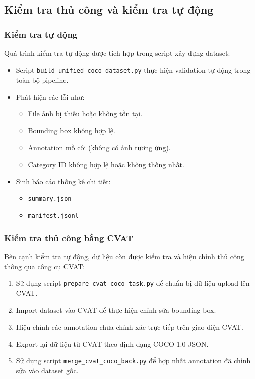 \subsection{Kiểm tra thủ công và kiểm tra tự động}

\subsubsection{Kiểm tra tự động}

Quá trình kiểm tra tự động được tích hợp trong script xây dựng dataset:

\begin{itemize}
    \item Script \texttt{build\_unified\_coco\_dataset.py} thực hiện validation tự động trong toàn bộ pipeline.
    \item Phát hiện các lỗi như:
    \begin{itemize}
        \item File ảnh bị thiếu hoặc không tồn tại.
        \item Bounding box không hợp lệ.
        \item Annotation mồ côi (không có ảnh tương ứng).
        \item Category ID không hợp lệ hoặc không thống nhất.
    \end{itemize}
    \item Sinh báo cáo thống kê chi tiết:
    \begin{itemize}
        \item \texttt{summary.json}
        \item \texttt{manifest.jsonl}
    \end{itemize}
\end{itemize}

\subsubsection{Kiểm tra thủ công bằng CVAT}

Bên cạnh kiểm tra tự động, dữ liệu còn được kiểm tra và hiệu chỉnh thủ công thông qua công cụ CVAT:

\begin{enumerate}
    \item Sử dụng script \texttt{prepare\_cvat\_coco\_task.py} để chuẩn bị dữ liệu upload lên CVAT.
    \item Import dataset vào CVAT để thực hiện chỉnh sửa bounding box.
    \item Hiệu chỉnh các annotation chưa chính xác trực tiếp trên giao diện CVAT.
    \item Export lại dữ liệu từ CVAT theo định dạng COCO 1.0 JSON.
    \item Sử dụng script \texttt{merge\_cvat\_coco\_back.py} để hợp nhất annotation đã chỉnh sửa vào dataset gốc.
\end{enumerate}

